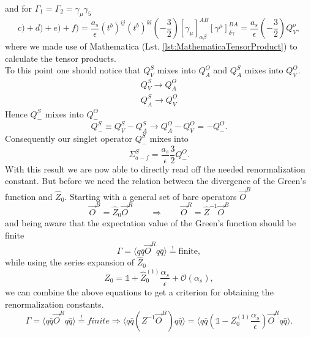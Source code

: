 	and for $\Gamma_1 = \Gamma_2 = \gamma_\mu \gamma_5$
	\begin{equation}
		c)+d)+e)+f) = \frac{a_s}{\epsilon}(t^b)^{ij}(t^b)^{kl}\left(-\frac{3}{2}\right) \left[\gamma_\mu\right]^{AB}_{\alpha\beta} \left[\gamma^\mu\right]^{BA}_{\delta\gamma} = \frac{a_s}{\epsilon} \left(-\frac{3}{2}\right) Q^o_V,
	\end{equation}	
	where we made use of Mathematica (Lst. \ref{lst:MathematicaTensorProduct}) to calculate the tensor products. \\
	To this point one should notice that $Q^S_V$ mixes into $Q^O_A$ and $Q^S_A$ mixes into $Q^O_V$.
	\begin{equation}
		\begin{split}
			Q^S_V \rightarrow Q^O_A \\
			Q^S_A \rightarrow Q^O_V
		\end{split}
	\end{equation}
	Hence $Q^S_-$ mixes into $Q^O_-$
	\begin{equation}
		Q^S_- \equiv Q^S_V - Q^S_A \rightarrow Q^O_A - Q^O_V = - Q^O_-.
	\end{equation}
	Consequently our singlet operator $Q^S_-$ mixes into 	
	\begin{equation}
		\Sigma^S_{a-f} = \frac{a_s}{\epsilon} \frac{3}{2} Q^O_-.
	\end{equation}
	With this result we are now able to directly read off the needed renormalization constant. But before we need the relation between the divergence of the Green's function and $\hat Z_0$. Starting with a general set of bare operators $\vec O^B$
	\begin{equation}
                \vec O^B = \hat Z_0 \vec O^R \qquad \Rightarrow \qquad \vec O^R = \hat Z^{-1} \vec O^B
        \end{equation}
	and being aware that the expectation value of the Green's function should be finite
        \begin{equation}
                \Gamma = \langle q \bar q \vec O^R q \bar q \rangle \overset{!}{=} \text{finite},
        \end{equation}
	while using the series expansion of $\hat Z_0$         
	\begin{equation}
                \hat Z_0 = \mathbb{1} + \hat Z_0^{(1)} \frac{\alpha_s}{\epsilon} + \mathcal{O}(\alpha_s),
        \end{equation}
	we can combine the above equations to get a criterion for obtaining the renormalization constants. 	
        \begin{equation}
                \label{eq:renormalizationConstant}
                \Gamma = \langle q \bar q \vec O^R q \bar q \rangle \overset{!}{=} finite \Rightarrow \langle q \bar q ( Z^{-1} \vec O^B  ) q \bar q\rangle = \langle q \bar q (\mathbb{1} - Z_0^{(1)} \frac{\alpha_s}{\epsilon}) \vec O^R q \bar q \rangle.
        \end{equation}
